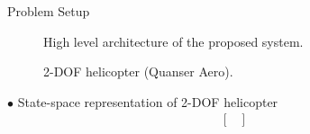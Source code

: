 \documentclass[final]{beamer}
\newlength{\onecolwid}
\begin{document}
\begin{frame}[t]
\begin{columns}[t]
\begin{column}{\onecolwid}
\begin{block}{Problem Setup}
\begin{figure}
    \centering
    \caption{High level architecture of the proposed system.}
    \label{fig:highLevelDiagram}
\end{figure}
\begin{figure}
    \centering
    \caption{2-DOF helicopter (Quanser Aero).}
    \label{fig:helicoterModel}
\end{figure}
\vskip -1cm
$\bullet$ State-space representation of 2-DOF helicopter
\begin{align*}
\begin{bmatrix}

\end{bmatrix}
\end{align*}
\end{block}
\end{column}
\end{columns}
\end{frame}
\end{document}

